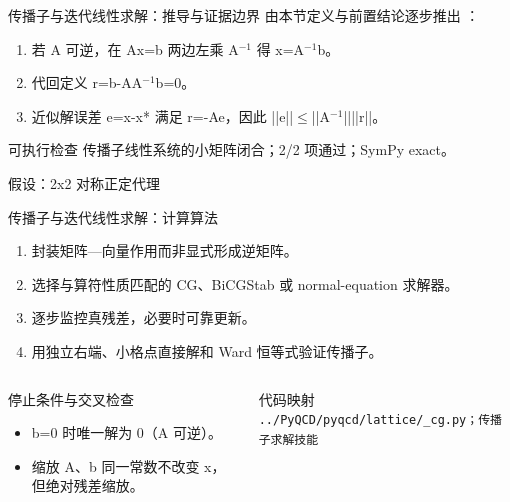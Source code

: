 \begin{frame}[t]{传播子与迭代线性求解：推导与证据边界}
\footnotesize
{}\quad 由本节定义与前置结论逐步推出 ：
\begin{enumerate}
\item 若 A 可逆，在 Ax=b 两边左乘 A\ensuremath{^{-1}} 得 x=A\ensuremath{^{-1}}b。
\item 代回定义 r=b-AA\ensuremath{^{-1}}b=0。
\item 近似解误差 e=x-x* 满足 r=-Ae，因此 ||e||\ensuremath{\le}||A\ensuremath{^{-1}}||||r||。
\end{enumerate}\begin{block}{可执行检查}
\quad 传播子线性系统的小矩阵闭合；2/2 项通过；SymPy exact。
\par\scriptsize 假设：2x2 对称正定代理
\end{block}
\end{frame}

\begin{frame}[t]{传播子与迭代线性求解：计算算法}
\footnotesize
{}\begin{enumerate}
\item 封装矩阵—向量作用而非显式形成逆矩阵。
\item 选择与算符性质匹配的 CG、BiCGStab 或 normal-equation 求解器。
\item 逐步监控真残差，必要时可靠更新。
\item 用独立右端、小格点直接解和 Ward 恒等式验证传播子。
\end{enumerate}\begin{columns}[T,onlytextwidth]
\begin{block}{停止条件与交叉检查}\scriptsize\begin{itemize}
\item[\CheckMark] b=0 时唯一解为 0（A 可逆）。
\item[\CheckMark] 缩放 A、b 同一常数不改变 x，但绝对残差缩放。
\end{itemize}\end{block}
\begin{block}{代码映射}
\scriptsize \texttt{.\allowbreak{}.\allowbreak{}/\allowbreak{}PyQCD/\allowbreak{}pyqcd/\allowbreak{}lattice/\allowbreak{}\_\allowbreak{}cg.\allowbreak{}py；传播子求解技能}
\end{block}\end{columns}\end{frame}

